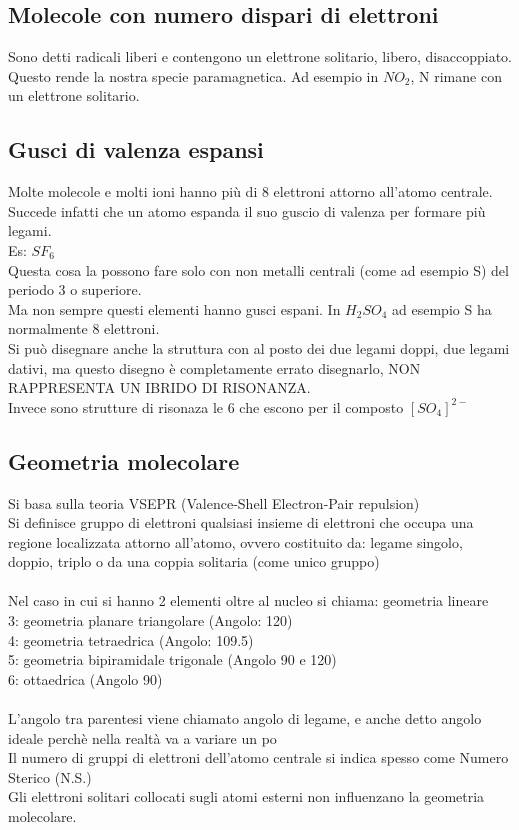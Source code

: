 \subsection{Molecole con numero dispari di elettroni}
Sono detti radicali liberi e contengono un elettrone solitario, libero, disaccoppiato. Questo rende la nostra specie paramagnetica. Ad esempio in $NO_2$, N rimane con un elettrone solitario.
\subsection{Gusci di valenza espansi}
Molte molecole e molti ioni hanno più di 8 elettroni attorno all'atomo centrale. Succede infatti che un atomo espanda il suo guscio di valenza per formare più legami.\\
Es: $SF_6$\\
Questa cosa la possono fare solo con non metalli centrali (come ad esempio S) del periodo 3 o superiore. \\
Ma non sempre questi elementi hanno gusci espani. In $H_2SO_4$ ad esempio S ha normalmente 8 elettroni. \\
Si può disegnare anche la struttura con al posto dei due legami doppi, due legami dativi, ma questo disegno è completamente errato disegnarlo, NON RAPPRESENTA UN IBRIDO DI RISONANZA. \\
Invece sono strutture di risonaza le 6 che escono per il composto $\left[SO_4\right]^{2-}$
\subsection{Geometria molecolare}
Si basa sulla teoria  VSEPR (Valence-Shell Electron-Pair repulsion)\\
Si definisce gruppo di elettroni qualsiasi insieme di elettroni che occupa una regione localizzata attorno all’atomo, ovvero costituito da: legame singolo, doppio, triplo o da una coppia solitaria (come unico gruppo) \\\\
Nel caso in cui si hanno 2 elementi oltre al nucleo si chiama: geometria lineare\\
3: geometria planare triangolare (Angolo: 120)\\
4: geometria tetraedrica (Angolo: 109.5)\\
5: geometria bipiramidale trigonale (Angolo 90 e 120)\\
6: ottaedrica (Angolo 90)\\\\
L’angolo tra parentesi viene chiamato angolo di legame, e anche detto angolo ideale perchè nella realtà va a variare un po\\
Il numero di gruppi di elettroni dell’atomo centrale si indica spesso come Numero Sterico (N.S.)\\
Gli elettroni solitari collocati sugli atomi esterni non influenzano la geometria molecolare.
